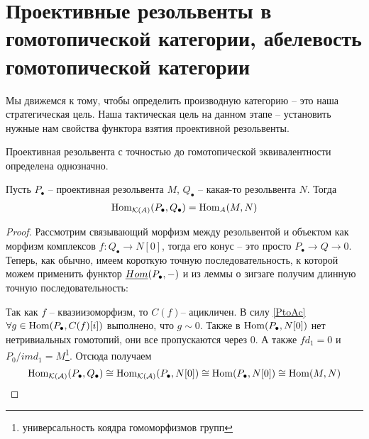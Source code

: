 \documentclass[../main.tex]{subfiles}
\begin{document}
\section{Проективные резольвенты в гомотопической категории, абелевость гомотопической категории}
Мы движемся к тому, чтобы определить производную категорию -- это наша стратегическая цель. Наша тактическая цель на данном этапе -- установить  нужные нам свойства функтора взятия проективной резольвенты.
\begin{to_com}
Проективная резольвента с точностью до гомотопической эквивалентности определена однозначно.
\end{to_com}
\begin{to_suj}
Пусть $P_\bullet$ -- проективная резольвента $M$, $Q_\bullet$ -- какая-то резольвента $N$.
Тогда 
\begin{align*}
\operatorname{Hom}_{\mathcal{K}(A)}(P_\bullet, Q_\bullet) = \operatorname{Hom}_{A}(M, N)
\end{align*}
\end{to_suj}
\begin{proof}
Рассмотрим связывающий морфизм между резольвентой и объектом как морфизм комплексов $f\colon Q_\bullet \to N[0] $, тогда его конус -- это просто $P_\bullet\to Q \to 0$. Теперь, как обычно, имеем короткую точную последовательность, к которой можем применить функтор $\underline{Hom}(P_\bullet, - )$ и из леммы о зигзаге получим длинную точную последовательность:
\bee
{}
\eee
\bee
{}
\eee
Так как $f$ -- квазиизоморфизм, то $C(f)$-- ацикличен. В силу \ref{PtoAc} $\forall g \in \operatorname{Hom}(P_\bullet, C(f)[i])$ выполнено, что $g \sim 0$. Также в $\operatorname{Hom}(P_\bullet, N[0])$ нет нетривиальных гомотопий, они все пропускаются через 0. А также $f d_1 = 0$ и $P_0/im d_1 = M$\footnote{универсальность коядра гомоморфизмов групп}. Отсюда получаем
\[
\operatorname{Hom}_{\mathcal{K(A)}}(P_\bullet, Q_\bullet) \cong \operatorname{Hom}_{\mathcal{K(A)}}(P_\bullet, N[0]) \cong \operatorname{Hom}(P_\bullet, N[0]) \cong \operatorname{Hom}(M, N)
\]
\end{proof}
\end{document}
